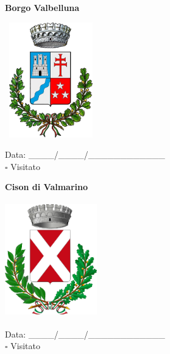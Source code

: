 \documentclass[a5paper,12pt]{article}
\begin{document}
\vspace{0.7cm}

\noindent
\begin{minipage}[t]{0.45\textwidth}
    \begin{center}
        \textbf{Borgo Valbelluna}
    \end{center}
    \vspace{-0.5cm} %
    \begin{center}
        \includegraphics[height= 5cm, width=4cm]{Veneto/Stemma Borgo Valbelluna.png}
    \end{center}
    \vspace{-0.4cm} %
    \begin{flushleft}
        Data: \_\_\_\_/\_\_\_\_/\_\_\_\_\_\_\_\_\_\_\_\_ \\
        $\square$ Visitato
    \end{flushleft}
\end{minipage}
\hfill
\noindent
\begin{minipage}[t]{0.45\textwidth}
    \begin{center}
        \textbf{Cison di Valmarino}
    \end{center}
    \vspace{-0.5cm} %
    \begin{center}
        \includegraphics[height= 5cm, width=4cm]{Veneto/Stemma Cison di Valmarino.png}
    \end{center}
    \vspace{-0.4cm} %
    \begin{flushleft}
        Data: \_\_\_\_/\_\_\_\_/\_\_\_\_\_\_\_\_\_\_\_\_ \\
        $\square$ Visitato
    \end{flushleft}
\end{minipage}
\end{document}
